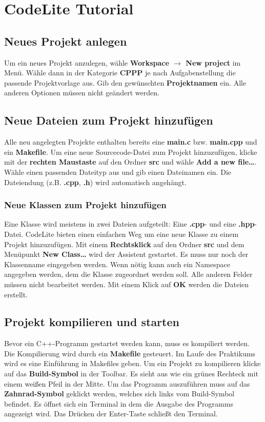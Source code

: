 \section{CodeLite Tutorial}

\subsection{Neues Projekt anlegen}
Um ein neues Projekt anzulegen, wähle \textbf{Workspace $\rightarrow$ New project} im Menü. Wähle dann in der Kategorie \textbf{CPPP} je nach Aufgabenstellung die passende Projektvorlage aus.
Gib den gewünschten \textbf{Projektnamen} ein. Alle anderen Optionen müssen nicht geändert werden.

\subsection{Neue Dateien zum Projekt hinzufügen}
Alle neu angelegten Projekte enthalten bereits eine \textbf{main.c} bzw. \textbf{main.cpp} und ein \textbf{Makefile}.
Um eine neue Sourcecode-Datei zum Projekt hinzuzufügen, klicke mit der \textbf{rechten Maustaste} auf den Ordner \textbf{src} und wähle \textbf{Add a new file\dots}.
Wähle einen passenden Dateityp aus und gib einen Dateinamen ein.
Die Dateiendung (z.B. \textbf{.cpp}, \textbf{.h}) wird automatisch angehängt.

\subsubsection{Neue Klassen zum Projekt hinzufügen}
Eine Klasse wird meistens in zwei Dateien aufgeteilt: Eine \textbf{.cpp}- und eine \textbf{.hpp}-Datei. CodeLite bieten einen einfachen Weg um eine neue Klasse zu einem Projekt hinzuzufügen. Mit einem \textbf{Rechtsklick} auf den Ordner \textbf{src} und dem Menüpunkt \textbf{New Class\dots} wird der Assistent gestartet. Es muss nur noch der Klassenname eingegeben werden. Wenn nötig kann auch ein Namespace angegeben werden, dem die Klasse zugeordnet werden soll. Alle anderen Felder müssen nicht bearbeitet werden. Mit einem Klick auf \textbf{OK} werden die Dateien erstellt.


\subsection{Projekt kompilieren und starten}
Bevor ein C++-Programm gestartet werden kann, muss es kompiliert werden.
Die Kompilierung wird durch ein \textbf{Makefile} gesteuert. Im Laufe des Praktikums wird es eine Einführung in Makefiles geben.
Um ein Projekt zu kompilieren klicke auf das \textbf{Build-Symbol} in der Toolbar. Es sieht aus wie ein grünes Rechteck mit einem weißen Pfeil in der Mitte.
Um das Programm auszuführen muss auf das \textbf{Zahnrad-Symbol} geklickt werden, welches sich links vom Build-Symbol befindet. Es öffnet sich ein Terminal in dem die Ausgabe des Programms angezeigt wird. Das Drücken der Enter-Taste schließt den Terminal.


